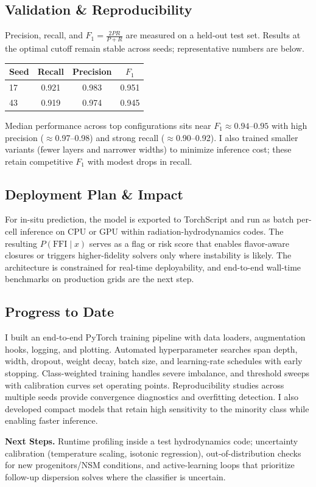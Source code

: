 \documentclass[10pt]{article}
\begin{document}
\begin{center}
\subsection*{Validation \& Reproducibility}
Precision, recall, and $F_1 = \frac{2PR}{P+R}$ are measured on a held-out test set.
Results at the optimal cutoff remain stable across seeds; representative numbers are below.

\begin{center}
\begin{tabular}{@{}lccc@{}}
\toprule
Seed & Recall & Precision & $F_1$ \\\midrule
17 & 0.921 & 0.983 & 0.951 \\
43 & 0.919 & 0.974 & 0.945 \\
\bottomrule
\end{tabular}
\end{center}

Median performance across top configurations sits near $F_1 \approx 0.94$--$0.95$ with high precision ($\approx$0.97--0.98) and strong recall ($\approx$0.90--0.92).
I also trained smaller variants (fewer layers and narrower widths) to minimize inference cost; these retain competitive $F_1$ with modest drops in recall.

\subsection*{Deployment Plan \& Impact}
For in-situ prediction, the model is exported to TorchScript and run as batch per-cell inference on CPU or GPU within radiation-hydrodynamics codes.
The resulting $P(\mathrm{FFI}\mid x)$ serves as a flag or risk score that enables flavor-aware closures or triggers higher-fidelity solvers only where instability is likely.
The architecture is constrained for real-time deployability, and end-to-end wall-time benchmarks on production grids are the next step.

\subsection*{Progress to Date}
I built an end-to-end PyTorch training pipeline with data loaders, augmentation hooks, logging, and plotting.
Automated hyperparameter searches span depth, width, dropout, weight decay, batch size, and learning-rate schedules with early stopping.
Class-weighted training handles severe imbalance, and threshold sweeps with calibration curves set operating points.
Reproducibility studies across multiple seeds provide convergence diagnostics and overfitting detection.
I also developed compact models that retain high sensitivity to the minority class while enabling faster inference.

\textbf{Next Steps.}
Runtime profiling inside a test hydrodynamics code; uncertainty calibration (temperature scaling, isotonic regression), out-of-distribution checks for new progenitors/NSM conditions, and active-learning loops that prioritize follow-up dispersion solves where the classifier is uncertain.
\end{center}
\end{document}
